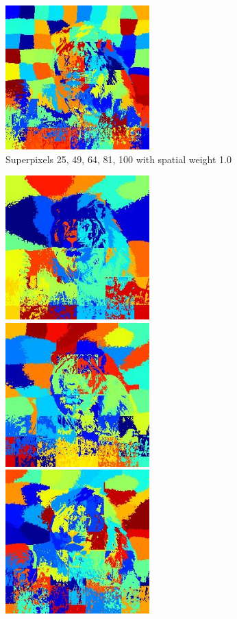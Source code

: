 \documentclass{article}
\begin{document}
\begin{figure}[h!]
	\includegraphics[height=15em]{code/outputs/prob1b_spatial_weight_1.0/prob1b_100.jpg}
	\caption{Superpixels 25, 49, 64, 81, 100 with spatial weight 1.0}
\end{figure}

\begin{figure}[h!]
  \centering
	\includegraphics[height=15em]{code/outputs/prob1b_spatial_weight_0.3/prob1b_25.jpg}
	\includegraphics[height=15em]{code/outputs/prob1b_spatial_weight_0.3/prob1b_49.jpg}
	\includegraphics[height=15em]{code/outputs/prob1b_spatial_weight_0.3/prob1b_64.jpg}

\end{figure}
\end{document}

